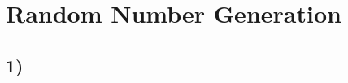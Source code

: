\documentclass[a4paper]{article}
\begin{document}
 
\section*{Random Number Generation}

\subsection*{1)}
\end{document}
